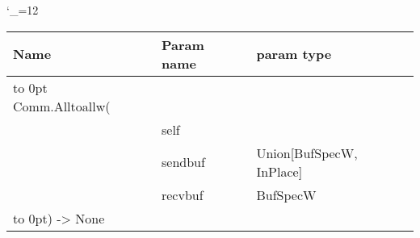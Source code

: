 \begingroup \catcode`\_=12 \tt
\begin{tabular}{lll}
\toprule
\textrm{Name}&\textrm{Param name}&\textrm{param type}\\
\midrule
\hbox to 0pt {Comm.Alltoallw(\hss}\\
& self\\
& sendbuf & Union[BufSpecW, InPlace]\\
& recvbuf & BufSpecW\\
\hbox to 0pt{) -> None\hss}\\
\bottomrule
\end{tabular}
\endgroup
